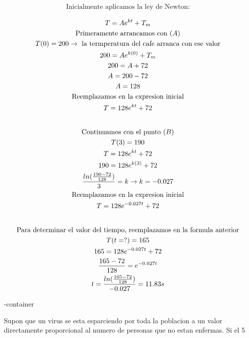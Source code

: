 \documentclass{article}
\begin{document}
\begin{gather*}
\text{Inicialmente aplicamos la ley de Newton:}
\end{gather*}



\begin{gather*}
T=Ae^{kt}+T_{m} \\
\text{Primeramente arrancamos con }(A) \\
T(0) =200  \rightarrow \text{ la termperatura del cafe arranca con ese valor} \\
200 = Ae^{k(0)}+T_{m} \\
200 = A+72 \\
A = 200-72 \\
A=128 \\
\text{Reemplazamos en la expresion inicial} \\
T=128e^{kt}+72 \\
\vspace{0.5em} \\
\text{Continuamos con el  punto }(B) \\
T(3) = 190 \\
T=128e^{kt}+72 \\
190 = 128e^{k(3)}+72 \\
\frac{ln(\frac{190-72}{128})}{3}= k  \rightarrow  k =-0.027 \\
\text{Reemplazamos en la expresion inicial} \\
T=128e^{-0.027t}+72 \\
\vspace{0.5em} \\
\text{Para determinar el valor del tiempo, reemplazamos en la formula anterior} \\
T(t=?) = 165 \\
165=128e^{-0.027t}+72 \\
\frac{165-72}{128} =e^{-0.027t} \\
t=\frac{ln(\frac{165-72}{128})}{-0.027} =11.83s
\end{gather*}




\image-container





Supon que un virus se esta esparciendo por toda la poblacion a un valor directamente proporcional al numero de personas que no estan enfermas. Si el 5%
\end{document}
